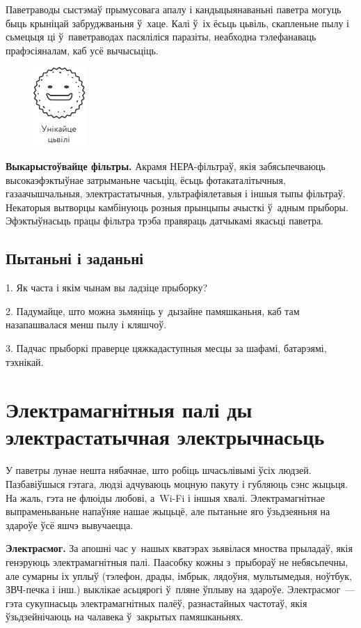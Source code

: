 Паветраводы сыстэмаў прымусовага апалу і кандыцыянаваньні паветра могуць быць крыніцай забруджваньня ў~хаце. Калі ў~іх ёсьць цьвіль, скапленьне пылу і сьмецьця ці ў~паветраводах пасяліліся паразіты, неабходна тэлефанаваць прафэсіяналам, каб усё вычысьціць.

\begin{figure}[htb!]
  \centering
  \includegraphics[scale=1.5]{willpower/ch11/10.pdf}
\end{figure}

\textbf{Выкарыстоўвайце фільтры.} Акрамя НЕРА-фільтраў, якія забясьпечваюць высокаэфэктыўнае затрыманьне часьціц, ёсьць фотакаталітычныя, газаачышчальныя, электрастатычныя, ультрафіялетавыя і іншыя тыпы фільтраў. Некаторыя вытворцы камбінуюць розныя прынцыпы ачысткі ў~адным прыборы. Эфэктыўнасьць працы фільтра трэба правяраць датчыкамі якасьці паветра.

\subsection*{Пытаньні і заданьні}

1. Як часта і якім чынам вы ладзіце прыборку?

2. Падумайце, што можна зьмяніць у~дызайне памяшканьня, каб там назапашвалася менш пылу і кляшчоў.

3. Падчас прыборкі праверце цяжкадаступныя месцы за шафамі, батарэямі, тэхнікай.


\section{Электрамагнітныя палі ды электрастатычная электрычнасьць}

У паветры лунае нешта нябачнае, што робіць шчасьлівымі ўсіх людзей. Пазбавіўшыся гэтага, людзі адчуваюць моцную пакуту і губляюць сэнс жыцьця. На жаль, гэта не флюіды любові, а~Wi-Fi і іншыя хвалі. Электрамагнітнае выпраменьваньне напаўняе нашае жыцьцё, але пытаньне яго ўзьдзеяньня на здароўе ўсё яшчэ вывучаецца.

\textbf{Электрасмог.} За апошні час у~нашых кватэрах зьявілася мноства прыладаў, якія генэруюць электрамагнітныя палі. Паасобку кожны з~прыбораў не небясьпечны, але сумарны іх уплыў (тэлефон, драды, імбрык, лядоўня, мультымедыя, ноўтбук, ЗВЧ-печка і інш.) выклікае асьцярогі ў~пляне ўплыву на здароўе. Электрасмог~--- гэта сукупнасьць электрамагнітных палёў, разнастайных частотаў, якія ўзьдзейнічаюць на чалавека ў~закрытых памяшканьнях.

